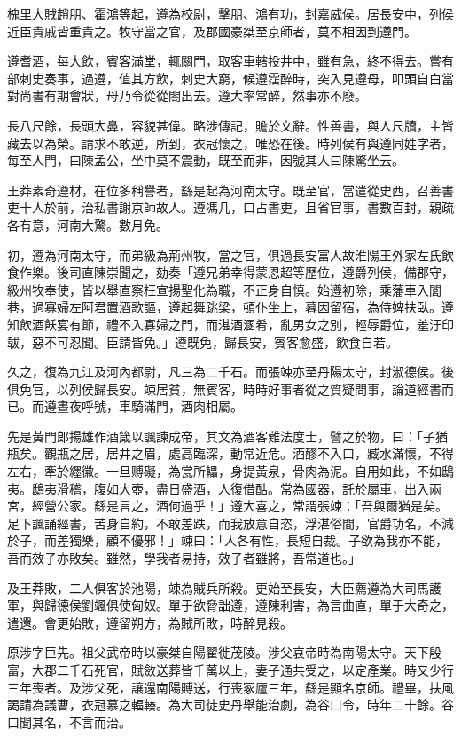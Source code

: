 \begin{pinyinscope}
槐里大賊趙朋、霍鴻等起，遵為校尉，擊朋、鴻有功，封嘉威侯。居長安中，列侯近臣貴戚皆重貴之。牧守當之官，及郡國豪桀至京師者，莫不相因到遵門。

遵耆酒，每大飲，賓客滿堂，輒關門，取客車轄投井中，雖有急，終不得去。嘗有部刺史奏事，過遵，值其方飲，刺史大窮，候遵霑醉時，突入見遵母，叩頭自白當對尚書有期會狀，母乃令從從閤出去。遵大率常醉，然事亦不廢。

長八尺餘，長頭大鼻，容貌甚偉。略涉傳記，贍於文辭。性善書，與人尺牘，主皆藏去以為榮。請求不敢逆，所到，衣冠懷之，唯恐在後。時列侯有與遵同姓字者，每至人門，曰陳孟公，坐中莫不震動，既至而非，因號其人曰陳驚坐云。

王莽素奇遵材，在位多稱譽者，繇是起為河南太守。既至官，當遣從史西，召善書吏十人於前，治私書謝京師故人。遵馮几，口占書吏，且省官事，書數百封，親疏各有意，河南大驚。數月免。

初，遵為河南太守，而弟級為荊州牧，當之官，俱過長安富人故淮陽王外家左氏飲食作樂。後司直陳崇聞之，劾奏「遵兄弟幸得蒙恩超等歷位，遵爵列侯，備郡守，級州牧奉使，皆以舉直察枉宣揚聖化為職，不正身自慎。始遵初除，乘藩車入閭巷，過寡婦左阿君置酒歌謳，遵起舞跳梁，頓仆坐上，暮因留宿，為侍婢扶臥。遵知飲酒飫宴有節，禮不入寡婦之門，而湛酒溷肴，亂男女之別，輕辱爵位，羞汙印韍，惡不可忍聞。臣請皆免。」遵既免，歸長安，賓客愈盛，飲食自若。

久之，復為九江及河內都尉，凡三為二千石。而張竦亦至丹陽太守，封淑德侯。後俱免官，以列侯歸長安。竦居貧，無賓客，時時好事者從之質疑問事，論道經書而已。而遵晝夜呼號，車騎滿門，酒肉相屬。

先是黃門郎揚雄作酒箴以諷諫成帝，其文為酒客難法度士，譬之於物，曰：「子猶瓶矣。觀瓶之居，居井之眉，處高臨深，動常近危。酒醪不入口，臧水滿懷，不得左右，牽於纆徽。一旦赙礙，為瓽所轠，身提黃泉，骨肉為泥。自用如此，不如鴟夷。鴟夷滑稽，腹如大壺，盡日盛酒，人復借酤。常為國器，託於屬車，出入兩宮，經營公家。繇是言之，酒何過乎！」遵大喜之，常謂張竦：「吾與爾猶是矣。足下諷誦經書，苦身自約，不敢差跌，而我放意自恣，浮湛俗間，官爵功名，不減於子，而差獨樂，顧不優邪！」竦曰：「人各有性，長短自裁。子欲為我亦不能，吾而效子亦敗矣。雖然，學我者易持，效子者雖將，吾常道也。」

及王莽敗，二人俱客於池陽，竦為賊兵所殺。更始至長安，大臣薦遵為大司馬護軍，與歸德侯劉颯俱使匈奴。單于欲脅詘遵，遵陳利害，為言曲直，單于大奇之，遣還。會更始敗，遵留朔方，為賊所敗，時醉見殺。

原涉字巨先。祖父武帝時以豪桀自陽翟徙茂陵。涉父哀帝時為南陽太守。天下殷富，大郡二千石死官，賦斂送葬皆千萬以上，妻子通共受之，以定產業。時又少行三年喪者。及涉父死，讓還南陽賻送，行喪冢廬三年，繇是顯名京師。禮畢，扶風謁請為議曹，衣冠慕之輻輳。為大司徒史丹舉能治劇，為谷口令，時年二十餘。谷口聞其名，不言而治。


\end{pinyinscope}
